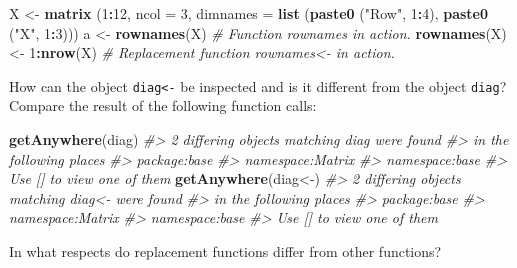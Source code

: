 \documentclass[
]{book}
\newenvironment{Shaded}{\begin{snugshade}}{\end{snugshade}}
\newcommand{\AttributeTok}[1]{\textcolor[rgb]{0.13,0.29,0.53}{#1}}
\newcommand{\CommentTok}[1]{\textcolor[rgb]{0.56,0.35,0.01}{\textit{#1}}}
\newcommand{\DecValTok}[1]{\textcolor[rgb]{0.00,0.00,0.81}{#1}}
\newcommand{\FunctionTok}[1]{\textcolor[rgb]{0.13,0.29,0.53}{\textbf{#1}}}
\newcommand{\NormalTok}[1]{#1}
\newcommand{\OtherTok}[1]{\textcolor[rgb]{0.56,0.35,0.01}{#1}}
\newcommand{\SpecialCharTok}[1]{\textcolor[rgb]{0.81,0.36,0.00}{\textbf{#1}}}
\newcommand{\StringTok}[1]{\textcolor[rgb]{0.31,0.60,0.02}{#1}}
\begin{document}
\begin{Shaded}
\begin{Highlighting}[]
\NormalTok{X }\OtherTok{\textless{}{-}} \FunctionTok{matrix}\NormalTok{ (}\DecValTok{1}\SpecialCharTok{:}\DecValTok{12}\NormalTok{, }\AttributeTok{ncol =} \DecValTok{3}\NormalTok{, }\AttributeTok{dimnames =} 
               \FunctionTok{list}\NormalTok{ (}\FunctionTok{paste0}\NormalTok{ (}\StringTok{"Row"}\NormalTok{, }\DecValTok{1}\SpecialCharTok{:}\DecValTok{4}\NormalTok{), }\FunctionTok{paste0}\NormalTok{ (}\StringTok{"X"}\NormalTok{, }\DecValTok{1}\SpecialCharTok{:}\DecValTok{3}\NormalTok{)))}
\NormalTok{a }\OtherTok{\textless{}{-}} \FunctionTok{rownames}\NormalTok{(X) }\CommentTok{\# Function rownames in action.}
\FunctionTok{rownames}\NormalTok{(X) }\OtherTok{\textless{}{-}} \DecValTok{1}\SpecialCharTok{:}\FunctionTok{nrow}\NormalTok{(X) }\CommentTok{\# Replacement function \textquotesingle{}rownames\textless{}{-}\textquotesingle{} in action.}
\end{Highlighting}
\end{Shaded}

How can the object \texttt{diag\textless{}-} be inspected and is it different from the object \texttt{diag}? Compare the result of the following function calls:

\begin{Shaded}
\begin{Highlighting}[]
\FunctionTok{getAnywhere}\NormalTok{(}\StringTok{\textquotesingle{}diag\textquotesingle{}}\NormalTok{)}
\CommentTok{\#\textgreater{} 2 differing objects matching \textquotesingle{}diag\textquotesingle{} were found}
\CommentTok{\#\textgreater{} in the following places}
\CommentTok{\#\textgreater{}   package:base}
\CommentTok{\#\textgreater{}   namespace:Matrix}
\CommentTok{\#\textgreater{}   namespace:base}
\CommentTok{\#\textgreater{} Use [] to view one of them}
\FunctionTok{getAnywhere}\NormalTok{(}\StringTok{\textquotesingle{}diag\textless{}{-}\textquotesingle{}}\NormalTok{)}
\CommentTok{\#\textgreater{} 2 differing objects matching \textquotesingle{}diag\textless{}{-}\textquotesingle{} were found}
\CommentTok{\#\textgreater{} in the following places}
\CommentTok{\#\textgreater{}   package:base}
\CommentTok{\#\textgreater{}   namespace:Matrix}
\CommentTok{\#\textgreater{}   namespace:base}
\CommentTok{\#\textgreater{} Use [] to view one of them}
\end{Highlighting}
\end{Shaded}

In what respects do replacement functions differ from other functions?
\end{document}
